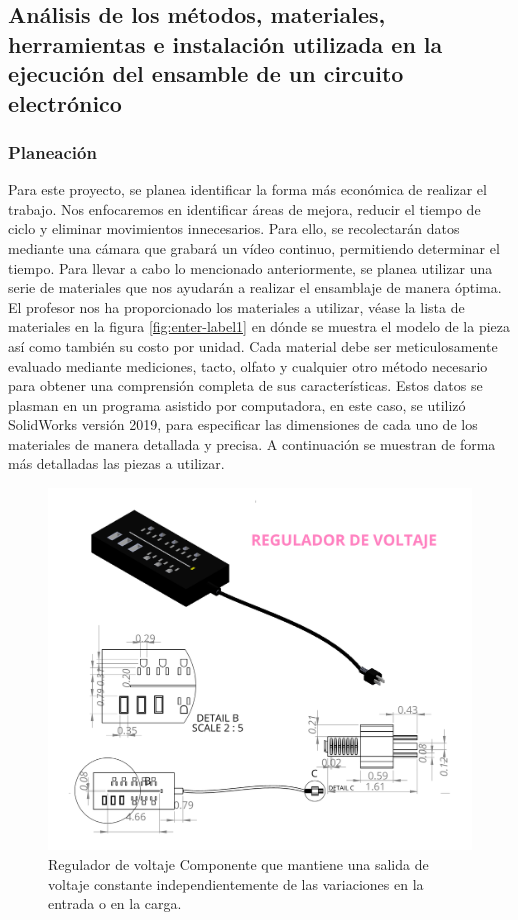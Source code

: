     \subsection{Análisis de los métodos, materiales, herramientas e instalación utilizada en la ejecución del ensamble de un circuito electrónico}
    
    \subsubsection{Planeación}
    Para este proyecto, se planea identificar la forma más económica de realizar el trabajo. Nos enfocaremos en identificar áreas de mejora, reducir el tiempo de ciclo y eliminar movimientos innecesarios. Para ello, se recolectarán datos mediante una cámara que grabará un vídeo continuo, permitiendo determinar el tiempo. 
    Para llevar a cabo lo mencionado anteriormente, se planea utilizar una serie de materiales que nos ayudarán a realizar el ensamblaje de manera óptima. El profesor nos ha proporcionado los materiales a utilizar, véase la lista de materiales en la figura \ref{fig:enter-label1} en dónde se muestra el modelo de la pieza así como también su costo por unidad.
    Cada material debe ser meticulosamente evaluado mediante mediciones, tacto, olfato y cualquier otro método necesario para obtener una comprensión completa de sus características. Estos datos se plasman en un programa asistido por computadora, en este caso, se utilizó SolidWorks versión 2019, para especificar las dimensiones de cada uno de los materiales de manera detallada y precisa. A continuación se muestran de forma más detalladas las piezas a utilizar.
    
    \begin{figure}[H]
        \centering
        \includegraphics[scale=0.3]{34/img/reguladorVoltaje.png}
        \caption{Regulador de voltaje Componente que mantiene
    una salida de voltaje constante independientemente
    de las variaciones en la entrada o en la
    carga.}
        \label{fig:reguladorVoltaje}
    \end{figure}
    
